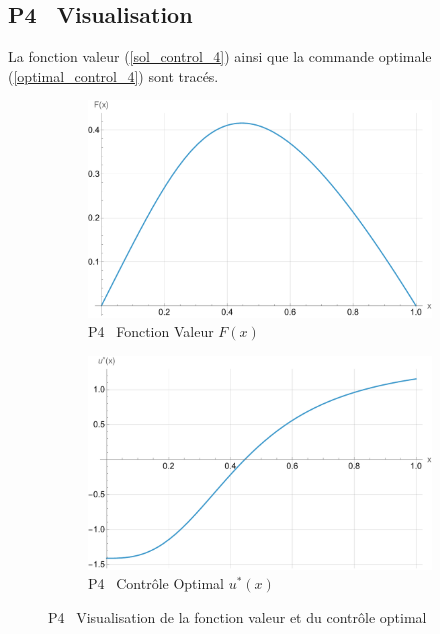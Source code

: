 \subsection{P4 \textemdash~Visualisation}
La fonction valeur (\ref{sol_control_4}) ainsi que la commande optimale (\ref{optimal_control_4}) sont tracés.
\begin{figure}[htb]
    \centering
    \begin{subfigure}{0.45\linewidth}
        \includegraphics[width=\linewidth]{img/validation/P4/p4_value.pdf}
        \caption{P4 \textemdash~Fonction Valeur $F(x)$}\label{fig:ValueVisualisation4}
    \end{subfigure}
    \hfill
    \begin{subfigure}{0.45\linewidth}
        \includegraphics[width=\linewidth]{img/validation/P4/p4_control.pdf}
        \caption{P4 \textemdash~Contrôle Optimal $u^*(x)$}\label{fig:ControlVisualisation4}
    \end{subfigure}
    \caption{P4 \textemdash~Visualisation de la fonction valeur et du contrôle optimal}\label{fig:ValueControlComparison4}
\end{figure}
